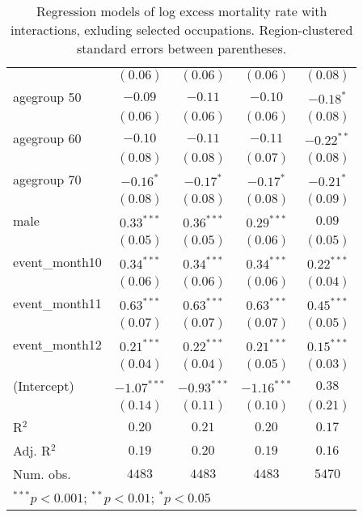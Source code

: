 \begin{table}
\begin{center}
\begin{tabular}{l c c c c}
                             & $(0.06)$      & $(0.06)$      & $(0.06)$      & $(0.08)$     \\
agegroup 50                  & $-0.09$       & $-0.11$       & $-0.10$       & $-0.18^{*}$  \\
                             & $(0.06)$      & $(0.06)$      & $(0.06)$      & $(0.08)$     \\
agegroup 60                  & $-0.10$       & $-0.11$       & $-0.11$       & $-0.22^{**}$ \\
                             & $(0.08)$      & $(0.08)$      & $(0.07)$      & $(0.08)$     \\
agegroup 70                  & $-0.16^{*}$   & $-0.17^{*}$   & $-0.17^{*}$   & $-0.21^{*}$  \\
                             & $(0.08)$      & $(0.08)$      & $(0.08)$      & $(0.09)$     \\
male                         & $0.33^{***}$  & $0.36^{***}$  & $0.29^{***}$  & $0.09$       \\
                             & $(0.05)$      & $(0.05)$      & $(0.06)$      & $(0.05)$     \\
event\_month10               & $0.34^{***}$  & $0.34^{***}$  & $0.34^{***}$  & $0.22^{***}$ \\
                             & $(0.06)$      & $(0.06)$      & $(0.06)$      & $(0.04)$     \\
event\_month11               & $0.63^{***}$  & $0.63^{***}$  & $0.63^{***}$  & $0.45^{***}$ \\
                             & $(0.07)$      & $(0.07)$      & $(0.07)$      & $(0.05)$     \\
event\_month12               & $0.21^{***}$  & $0.22^{***}$  & $0.21^{***}$  & $0.15^{***}$ \\
                             & $(0.04)$      & $(0.04)$      & $(0.05)$      & $(0.03)$     \\
(Intercept)                  & $-1.07^{***}$ & $-0.93^{***}$ & $-1.16^{***}$ & $0.38$       \\
                             & $(0.14)$      & $(0.11)$      & $(0.10)$      & $(0.21)$     \\
\hline
R$^2$                        & $0.20$        & $0.21$        & $0.20$        & $0.17$       \\
Adj. R$^2$                   & $0.19$        & $0.20$        & $0.19$        & $0.16$       \\
Num. obs.                    & $4483$        & $4483$        & $4483$        & $5470$       \\
\hline
\multicolumn{5}{l}{\scriptsize{$^{***}p<0.001$; $^{**}p<0.01$; $^{*}p<0.05$}}
\end{tabular}
\caption{Regression models of log excess mortality rate with interactions, exluding selected occupations. Region-clustered standard errors between parentheses.}
\label{tab:intermodels}
\end{center}
\end{table}
